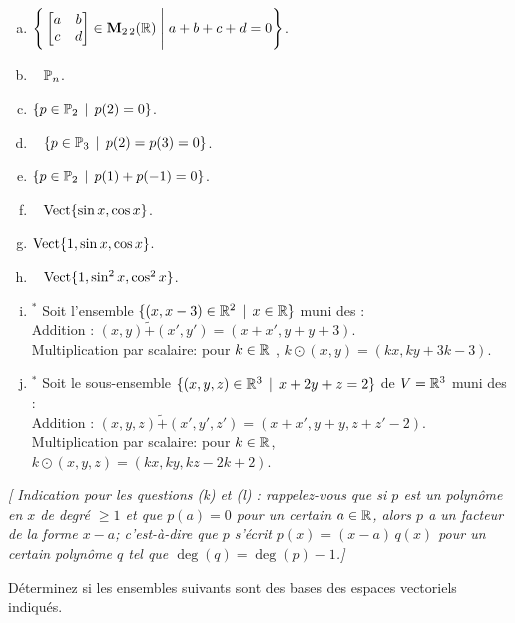 \begin{prob}
\begin{enumerate}[(a)]
\item  $\Bigg\{  \bmatrix a&b\\ c&d\endbmatrix \in \M_{2 \,2}(\R) \;\Bigg|\; a+b+c+d=0\Bigg\}$.      \medskip


\item\sov~ $ \PP_n $.  \medskip

\item  $ \set{p \in \PP_2 \st  p(2)=0}$.  \medskip


\item\sov~ $ \set{p \in \PP_3 \st  p(2)=p(3)=0}$.  \medskip



\item  $ \set{p \in \PP_2 \st  p(1)+p(-1)=0}$.      \medskip

\item\sov~ $ \sp{\sin x, \cos x}$.      \medskip

\item  $ \sp{1, \sin x, \cos x}$.      \medskip

 \item\sov~ $ \sp{1, \sin^2 x, \cos^2 x}$.      \medskip


\item$^\ast$  Soit l'ensemble $\set{(x, x-3) \in \R^2\st x\in \R}$ muni des  :\\ 
Addition : $(x,y) \tilde+ (x',y')=(x+x', y+y +3).$\\ 
Multiplication par scalaire: pour $k\in \R$ , $k \odot (x,y)=(kx, ky+3k-3).$

\item$^\ast$ Soit le sous-ensemble $\set{(x, y, z) \in \R^3\st x+2y+z=2 }$ de $V=\R^3$ muni des    :\\
Addition : $(x,y,z) \tilde+ (x',y',z')=(x+x', y+y,z+z'-2)$.\\ 
Multiplication par scalaire: pour $k\in \R$, $k\odot (x,y,z)=(kx, ky, kz-2k+2)$.\medskip 

\end{enumerate}
{\it [ Indication pour les questions (k) et (l) : rappelez-vous que si $p$ est un polynôme en $x$ de degré $\geq1$ et que $p(a)=0$ pour un certain $a \in \R$, alors $p$ a un facteur de la forme $x-a$; c'est-à-dire que $p$ s'écrit $p(x)=(x-a)\, q(x)$ pour un certain polynôme $q$ tel que $\deg(q)=\deg(p)-1$.]}



\end{prob} \begin{prob} \label{prob09.2} Déterminez si les ensembles suivants sont des bases des espaces vectoriels indiqués.  
  

\end{prob}
